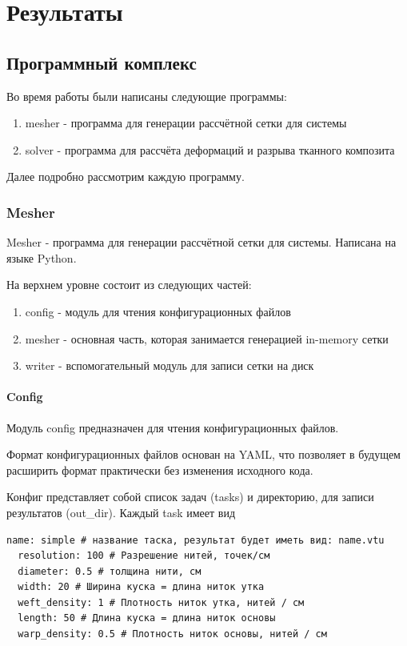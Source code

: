 \chapter{Результаты}\label{ch:results}

\section*{Программный комплекс}
Во время работы были написаны следующие программы:
\begin{enumerate}
    \item mesher - программа для генерации рассчётной сетки для системы
    \item solver - программа для рассчёта деформаций и разрыва тканного композита
\end{enumerate}
Далее подробно рассмотрим каждую программу.

\subsection*{Mesher}
Mesher - программа для генерации рассчётной сетки для системы.
Написана на языке Python.

На верхнем уровне состоит из следующих частей:
\begin{enumerate}
    \item config - модуль для чтения конфигурационных файлов
    \item mesher - основная часть, которая занимается генерацией in-memory сетки
    \item writer - вспомогательный модуль для записи сетки на диск
\end{enumerate}

\subsubsection*{Config}
Модуль config предназначен для чтения конфигурационных файлов.

Формат конфигурационных файлов основан на YAML, что позволяет в будущем расширить формат практически без
изменения исходного кода.

Конфиг представляет собой список задач (tasks) и директорию, для записи результатов (out\_dir).
Каждый task имеет вид
\begin{verbatim}
name: simple # название таска, результат будет иметь вид: name.vtu
  resolution: 100 # Разрешение нитей, точек/см
  diameter: 0.5 # толщина нити, см
  width: 20 # Ширина куска = длина ниток утка
  weft_density: 1 # Плотность ниток утка, нитей / см
  length: 50 # Длина куска = длина ниток основы
  warp_density: 0.5 # Плотность ниток основы, нитей / см
\end{verbatim}

